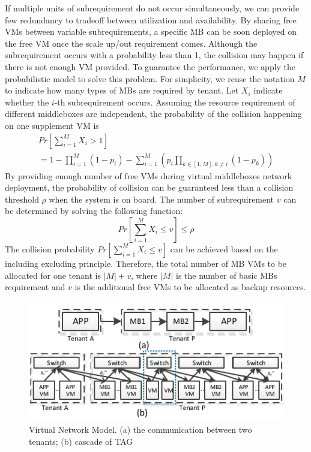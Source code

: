 \documentclass[10pt, conference, letterpaper]{IEEEtran}
\begin{document}
If multiple units of subrequirement do not occur simultaneously, we can provide few redundancy to tradeoff between utilization and availability. By sharing free VMs between variable subrequirements, a specific MB can be soon deployed on the free VM once the scale up/out requirement comes. Although the subrequirement occurs with a probability less than 1, the collision may happen if there is not enough VM provided. To guarantee the performance, we apply the probabilistic model to solve this problem. For simplicity, we reuse the notation $M$ to indicate how many types of MBs are required by tenant. Let $X_{i}$ indicate whether the $i$-th subrequirement occurs. Assuming the resource requirement of different middleboxes are independent, the probability of the collision happening on one supplement VM is
\begin{align}
&Pr\left[ \sum_{i=1}^{M} X_{i} > 1 \right] & \nonumber \\
&= 1-\prod_{i=1}^{M}(1-p_{i})-\sum_{i=1}^{M}\left(p_{i}\prod_{k\in[1,M], k\neq i}(1-p_{k})\right)&
\end{align}
By providing enough number of free VMs during virtual middleboxes network deployment, the probability of collision can be guaranteed less than a collision threshold $\rho$ when the system is on board. The number of subrequirement $v$ can be determined by solving the following function:
\begin{equation}\label{equ:collision}  
		Pr\left[ \sum_{i=1}^{M} X_{i} \leq v \right] \leq \rho
\end{equation}
The collision probability $Pr\left[ \sum_{i=1}^{M} X_{i} \leq v \right]$ can be achieved based on the including excluding principle. Therefore, the total number of MB VMs to be allocated for one tenant is $|M|+v$, where $|M|$ is the number of basic MBs requirement and $v$ is the additional free VMs to be allocated as backup resources. 

\begin{figure}
	\centering
		\includegraphics[width=3.3 in]{fig/scalability.pdf}
	\caption{Virtual Network Model. (a) the communication between two tenants; (b) cascade of TAG}
	\label{fig:scalability}
\end{figure}
\end{document}
